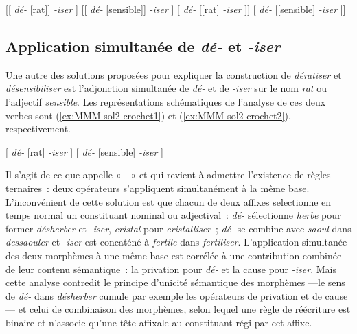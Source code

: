 \documentclass[output=paper]{langsci/langscibook}
\begin{document}
\begin{exe}
\ex\label{ex:MMM-sol1-crochet1} [[ \emph{\mbox{dé-}} [rat]] \emph{\mbox{-iser}} ]
\ex\label{ex:MMM-sol1-crochet2} [[ \emph{\mbox{dé-}} [sensible]] \emph{\mbox{-iser}} ]
\ex\label{ex:MMM-sol1-crochet3} [ \emph{\mbox{dé-}} [[rat] \emph{\mbox{-iser}} ]]
\ex\label{ex:MMM-sol1-crochet4} [ \emph{\mbox{dé-}} [[sensible] \emph{\mbox{-iser}} ]]
\end{exe}


\subsection{Application simultanée de \emph{\mbox{dé-}} et \emph{\mbox{-iser}}}
\label{sec:MMM-sol2}

Une autre des solutions proposées pour expliquer la construction de \emph{dératiser} et \emph{désensibiliser} est  l'adjonction simultanée de \emph{\mbox{dé-}} et de \emph{\mbox{-iser}} sur le nom \emph{rat} ou l'adjectif \emph{sensible}. Les représentations schématiques de l'analyse de ces deux verbes sont (\ref{ex:MMM-sol2-crochet1}) et (\ref{ex:MMM-sol2-crochet2}), respectivement.
%
\begin{exe}
\ex\label{ex:MMM-sol2-crochet1} [ \emph{\mbox{dé-}} [rat] \emph{\mbox{-iser}} ]
\ex\label{ex:MMM-sol2-crochet2} [ \emph{\mbox{dé-}} [sensible] \emph{\mbox{-iser}} ]
\end{exe}
%
Il s'agit de ce que \citet{Booij2002} appelle «~~» et qui revient à admettre l'existence de règles ternaires~: deux opérateurs s'appliquent simultanément à la même base.  L'inconvénient de cette solution est que chacun de deux affixes selectionne en temps normal un constituant nominal ou adjectival~: \emph{\mbox{dé-}} sélectionne  \emph{herbe} pour former \emph{désherber} et \emph{\mbox{-iser}}, \emph{cristal} pour \emph{cristalliser}~; \emph{\mbox{dé-}} se combine avec \emph{saoul} dans \emph{dessaouler}
et \emph{\mbox{-iser}} est concaténé à \emph{fertile} dans \emph{fertiliser}.  L'application simultanée des deux morphèmes à une même base est corrélée à une contribution combinée de leur contenu sémantique~: la privation pour \emph{\mbox{dé-}} et la cause pour \emph{\mbox{-iser}}.  Mais cette analyse contredit le principe d'unicité sémantique des morphèmes ---le sens de \emph{\mbox{dé-}} dans \emph{désherber} cumule par exemple les opérateurs de privation et de cause--- et celui de combinaison des morphèmes, selon lequel une règle de réécriture est binaire et n'associe qu'une tête affixale au constituant régi par cet affixe.
\end{document}
